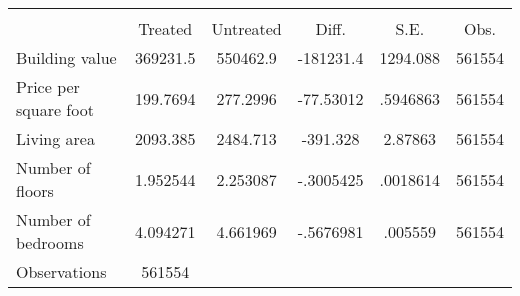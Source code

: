 {
\def\sym#1{\ifmmode^{#1}\else\(^{#1}\)\fi}
\begin{tabular}{l*{1}{ccccc}}
\toprule
                &\multicolumn{5}{c}{}                             \\
                &  Treated&Untreated&    Diff.&     S.E.&     Obs.\\
\midrule
Building value  & 369231.5& 550462.9&-181231.4& 1294.088&   561554\\
Price per square foot& 199.7694& 277.2996&-77.53012& .5946863&   561554\\
Living area     & 2093.385& 2484.713& -391.328&  2.87863&   561554\\
Number of floors& 1.952544& 2.253087&-.3005425& .0018614&   561554\\
Number of bedrooms& 4.094271& 4.661969&-.5676981&  .005559&   561554\\
\midrule
Observations    &   561554&         &         &         &         \\
\bottomrule
\end{tabular}
}
